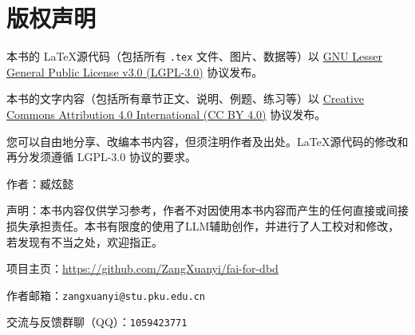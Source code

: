 \chapter{版权声明}

本书的 \LaTeX 源代码（包括所有 \verb|.tex| 文件、图片、数据等）以 \href{https://www.gnu.org/licenses/lgpl-3.0.html}{GNU Lesser General Public License v3.0 (LGPL-3.0)} 协议发布。

本书的文字内容（包括所有章节正文、说明、例题、练习等）以 \href{https://creativecommons.org/licenses/by/4.0/}{Creative Commons Attribution 4.0 International (CC BY 4.0)} 协议发布。

您可以自由地分享、改编本书内容，但须注明作者及出处。\LaTeX 源代码的修改和再分发须遵循 LGPL-3.0 协议的要求。

作者：臧炫懿

声明：本书内容仅供学习参考，作者不对因使用本书内容而产生的任何直接或间接损失承担责任。本书有限度的使用了LLM辅助创作，并进行了人工校对和修改，若发现有不当之处，欢迎指正。

项目主页：\url{https://github.com/ZangXuanyi/fai-for-dbd}

作者邮箱：\verb|zangxuanyi@stu.pku.edu.cn|

交流与反馈群聊（QQ）：\verb|1059423771|